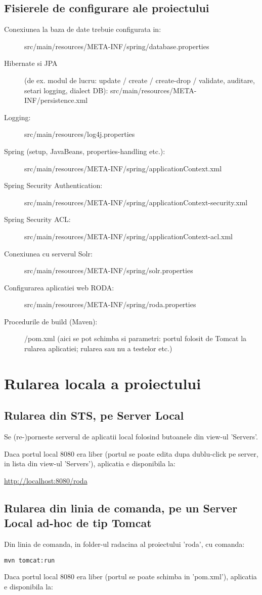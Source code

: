 \subsection{Fisierele de configurare ale proiectului}
\begin{description}
\item[Conexiunea la baza de date trebuie configurata in:]
src/main/resources/META-INF/spring/database.properties
\item[Hibernate si JPA] (de ex. modul de lucru: update / create / create-drop /
validate, auditare, setari logging, dialect DB):
src/main/resources/META-INF/persistence.xml
\item[Logging:]
src/main/resources/log4j.properties
\item[Spring (setup, JavaBeans, properties-handling etc.):]
src/main/resources/META-INF/spring/applicationContext.xml
\item[Spring Security Authentication:]
src/main/resources/META-INF/spring/applicationContext-security.xml
\item[Spring Security ACL:]
src/main/resources/META-INF/spring/applicationContext-acl.xml
\item[Conexiunea cu serverul Solr:]
src/main/resources/META-INF/spring/solr.properties
\item[Configurarea aplicatiei web RODA:]
src/main/resources/META-INF/spring/roda.properties
\item[Procedurile de build (Maven):]
/pom.xml
(aici se pot schimba si parametri: portul folosit de Tomcat la rularea aplicatiei; rularea sau nu a testelor etc.)
\end{description}

\section{Rularea locala a proiectului}

\subsection{Rularea din STS, pe Server Local}
Se (re-)porneste serverul de aplicatii local folosind butoanele din view-ul
'Servers'.

Daca portul local 8080 era liber (portul se poate edita dupa dublu-click pe
server, in lista din view-ul 'Servers'), aplicatia e disponibila la:

\url{http://localhost:8080/roda}

\subsection{Rularea din linia de comanda, pe un Server Local ad-hoc de tip
Tomcat}
Din linia de comanda, in folder-ul radacina al proiectului 'roda', cu comanda:
\begin{lstlisting}
mvn tomcat:run
\end{lstlisting}
Daca portul local 8080 era liber (portul se poate schimba in 'pom.xml'),
aplicatia e disponibila la:

